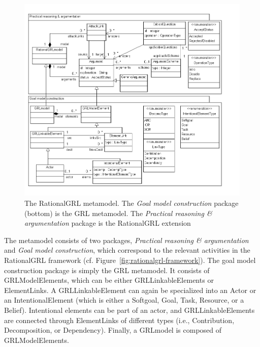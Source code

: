 \begin{figure}[t]
\includegraphics[width=\textwidth]{metamodel/metamodel}
\caption{The RationalGRL metamodel. The \emph{Goal model construction} package (bottom) is the GRL metamodel. The \emph{Practical reasoning \& argumentation} package is the RationalGRL extension}
\label{fig:metamodel}
\end{figure}

The metamodel consists of two packages, \emph{Practical reasoning \& argumentation} and \emph{Goal model construction}, which correspond to the relevant activities in the RationalGRL framework (cf. Figure~\ref{fig:rationalgrl-framework}). The goal model construction package is simply the GRL metamodel. It consists of \textsf{GRLModelElements}, which can be either \textsf{GRLLinkableElements} or \textsf{ElementLinks}. A \textsf{GRLLinkableElement} can again be specialized into an \textsf{Actor} or an \textsf{IntentionalElement} (which is either a \textsf{Softgoal}, \textsf{Goal}, \textsf{Task}, \textsf{Resource}, or a \textsf{Belief}). Intentional elements can be part of an actor, and \textsf{GRLLinkableElements} are connected through \textsf{ElementLinks} of different types (i.e., \textsf{Contribution, Decomposition}, or \textsf{Dependency}). Finally, a \textsf{GRLmodel} is composed of \textsf{GRLModelElements}.

